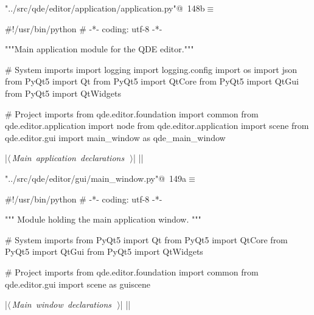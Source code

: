 \documentclass[%
    a4paper,    %
    justified,  %
    nobib,      %
    openany     %
]{tufte-book}
\begin{document}
\begin{flushleft} \small
\begin{minipage}{\linewidth}\label{scrap167}\raggedright\small
{} \verb@"../src/qde/editor/application/application.py"@\nobreak\ {\footnotesize {148b}}$\equiv$
\vspace{-1ex}
\begin{pythoncode}
#!/usr/bin/python
# -*- coding: utf-8 -*-

"""Main application module for the QDE editor."""

# System imports
import logging
import logging.config
import os
import json
from PyQt5 import Qt
from PyQt5 import QtCore
from PyQt5 import QtGui
from PyQt5 import QtWidgets

# Project imports
from qde.editor.foundation import common
from qde.editor.application import node
from qde.editor.application import scene
from qde.editor.gui import main_window as qde_main_window


|\hbox{$\langle\,${\itshape Main application declarations}\nobreak\ {\footnotesize {}}$\,\rangle$}|
|\NWsep|
\end{pythoncode}
\vspace{1.5ex}
\footnotesize
\begin{list}{}{\setlength{\itemsep}{-\parsep}\setlength{\itemindent}{-\leftmargin}}

\item{}
\end{list}
\end{minipage}\vspace{4ex}
\end{flushleft}
\begin{flushleft} \small
\begin{minipage}{\linewidth}\label{scrap168}\raggedright\small
{} \verb@"../src/qde/editor/gui/main_window.py"@\nobreak\ {\footnotesize {149a}}$\equiv$
\vspace{-1ex}
\begin{pythoncode}
#!/usr/bin/python
# -*- coding: utf-8 -*-

""" Module holding the main application window. """

# System imports
from PyQt5 import Qt
from PyQt5 import QtCore
from PyQt5 import QtGui
from PyQt5 import QtWidgets

# Project imports
from qde.editor.foundation import common
from qde.editor.gui import scene as guiscene


|\hbox{$\langle\,${\itshape Main window declarations}\nobreak\ {\footnotesize {}}$\,\rangle$}|
|\NWsep|
\end{pythoncode}
\vspace{1.5ex}
\footnotesize
\begin{list}{}{\setlength{\itemsep}{-\parsep}\setlength{\itemindent}{-\leftmargin}}

\item{}
\end{list}
\end{minipage}\vspace{4ex}
\end{flushleft}
\end{document}
